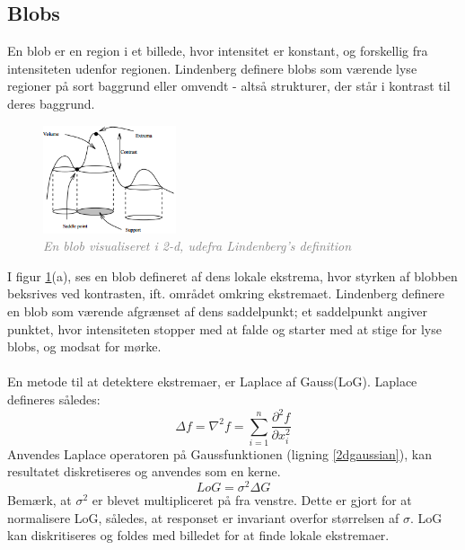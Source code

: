 \subsection{Blobs}
En blob er en region i et billede, hvor intensitet er konstant, og forskellig fra intensiteten udenfor regionen. Lindenberg \cite{blob} definere blobs som værende lyse regioner på sort baggrund eller omvendt - altså strukturer, der står i kontrast til deres baggrund. 

\begin{figure}[H]
    \centering
    \includegraphics[width=0.35\textwidth]{fig/11.png}
    \vspace{-0.5em}   
    \begin{center}
    \caption{\textcolor{gray}{\footnotesize \textit{
    En blob visualiseret i 2-d, udefra Lindenberg's definition \cite{blob}}}}
    \label{fig:lindblob}
     \end{center}
  \end{figure}
       \vspace{-2.7em}
\noindent
I figur \ref{fig:lindblob}(a), ses en blob defineret af dens lokale ekstrema, hvor styrken af blobben beksrives ved kontrasten, ift. området omkring ekstremaet. Lindenberg definere en blob som værende afgrænset af dens saddelpunkt; et saddelpunkt angiver punktet, hvor intensiteten stopper med at falde og starter med at stige for lyse blobs, og modsat for mørke.
\\
\\
En metode til at detektere ekstremaer, er Laplace af Gauss(LoG). Laplace defineres således:
\begin{equation}
\Delta f = \nabla^2 f =  \sum_{i = 1}^n \frac{\partial^2 f}{\partial x^2_i}
\end{equation}
Anvendes Laplace operatoren på Gaussfunktionen (ligning \eqref{2dgaussian}), kan resultatet diskretiseres og anvendes som en kerne.
\begin{equation}
LoG= \sigma^2\Delta G
\label{lap}
\end{equation}
Bemærk, at $\sigma^2$ er blevet multipliceret på fra venstre. Dette er gjort for at normalisere LoG, således, at responset er invariant overfor størrelsen af $\sigma$. LoG kan diskritiseres og foldes med billedet for at finde lokale ekstremaer. \\

